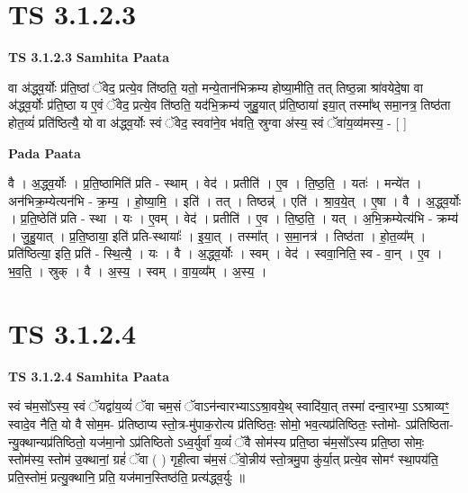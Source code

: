 \documentclass[17pt]{extarticle}
\begin{document}

\section{ TS 3.1.2.3 }

\textbf{TS 3.1.2.3 } \newline
\textbf{Samhita Paata} \newline

वा अ॑द्ध्व॒र्योः प्र॑ति॒ष्ठां ॅवेद॒ प्रत्ये॒व ति॑ष्ठति॒ यतो॒ मन्ये॒तान॑भिक्रम्य होष्या॒मीति॒ तत् तिष्ठ॒न्ना श्रा॑वयेदे॒षा वा अ॑द्ध्व॒र्योः प्र॑ति॒ष्ठा य ए॒वं ॅवेद॒ प्रत्ये॒व ति॑ष्ठति॒ यद॑भि॒क्रम्य॑ जुहु॒यात् प्र॑ति॒ष्ठाया॑ इया॒त् तस्मा᳚थ् समा॒नत्र॒ तिष्ठ॑ता होत॒व्यं॑ प्रति॑ष्ठित्यै॒ यो वा अ॑द्ध्व॒र्योः स्वं ॅवेद॒ स्ववा॑ने॒व भ॑वति॒ स्रुग्वा अ॑स्य॒ स्वं ॅवा॑य॒व्य॑मस्य॒ - [  ] \newline

\textbf{Pada Paata} \newline

वै । अ॒द्ध्व॒र्योः । प्र॒ति॒ष्ठामिति॑ प्रति - स्थाम् । वेद॑ । प्रतीति॑ । ए॒व । ति॒ष्ठ॒ति॒ । यतः॑ । मन्ये॑त । अन॑भिक्र॒म्येत्यन॑भि - क्र॒म्य॒ । हो॒ष्या॒मि॒ । इति॑ । तत् । तिष्ठन्न्॑ । एति॑ । श्रा॒व॒ये॒त् । ए॒षा । वै । अ॒द्ध्व॒र्योः । प्र॒ति॒ष्ठेति॑ प्रति - स्था । यः । ए॒वम् । वेद॑ । प्रतीति॑ । ए॒व । ति॒ष्ठ॒ति॒ । यत् । अ॒भि॒क्रम्येत्य॑भि - क्रम्य॑ । जु॒हु॒यात् । प्र॒ति॒ष्ठाया॒ इति॑ प्रति-स्थायाः᳚ । इ॒या॒त् । तस्मा᳚त् । स॒मा॒नत्र॑ । तिष्ठ॑ता । हो॒त॒व्य᳚म् । प्रति॑ष्ठित्या॒ इति॒ प्रति॑ - स्थि॒त्यै॒ । यः । वै । अ॒द्ध्व॒र्योः । स्वम् । वेद॑ । स्ववा॒निति॒ स्व - वा॒न् । ए॒व । भ॒व॒ति॒ । स्रुक् । वै । अ॒स्य॒ । स्वम् । वा॒य॒व्य᳚म् । अ॒स्य॒ ।  \newline





\section{ TS 3.1.2.4 }

\textbf{TS 3.1.2.4 } \newline
\textbf{Samhita Paata} \newline

स्वं च॑म॒सो᳚ऽस्य॒ स्वं ॅयद्वा॑य॒व्यं॑ ॅवा चम॒सं ॅवाऽन॑न्वारभ्याऽऽश्रा॒वये॒थ् स्वादि॑या॒त् तस्मा॑ दन्वा॒रभ्या॒ ऽऽश्राव्यꣳ॒॒ स्वादे॒व नैति॒ यो वै सोम॒म- प्र॑तिष्ठाप्य स्तो॒त्र-मु॑पाक॒रोत्य प्र॑तिष्ठितः॒ सोमो॒ भव॒त्यप्र॑तिष्ठितः॒ स्तोमो- ऽप्र॑तिष्ठिता-न्यु॒क्थान्यप्र॑तिष्ठितो॒ यज॑मा॒नो ऽप्र॑तिष्ठितो ऽध्व॒र्युर्वा॑ य॒व्यं॑ ॅवै सोम॑स्य प्रति॒ष्ठा च॑म॒सो᳚ऽस्य प्रति॒ष्ठा सोमः॒ स्तोम॑स्य॒ स्तोम॑ उ॒क्थानां॒ ग्रहं॑ ॅवा ( ) गृही॒त्वा च॑म॒सं ॅवो॒न्नीय॑ स्तो॒त्रमु॒पा कु॑र्या॒त् प्रत्ये॒व सोमꣳ॑ स्था॒पय॑ति॒ प्रति॒स्तोमं॒ प्रत्यु॒क्थानि॒ प्रति॒ यज॑मान॒स्तिष्ठ॑ति॒ प्रत्य॑द्ध्व॒र्युः ॥ \newline
\end{document}
